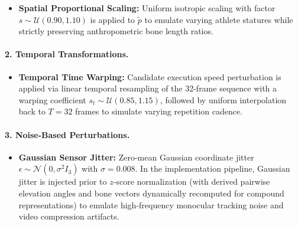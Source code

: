 \documentclass[runningheads]{llncs}
\begin{document}
\begin{itemize}
\begin{equation}
    \end{equation}
    Because $R_y(\alpha)$ acts strictly within the transverse plane, vertical displacement remains invariant ($\Delta y' = \Delta y$) and horizontal Euclidean radius is identically preserved:
    \begin{equation}
    \label{eq:yaw_invariance}
        \Delta x'^2 + \Delta z'^2 = (\Delta x \cos\alpha + \Delta z \sin\alpha)^2 + (-\Delta x \sin\alpha + \Delta z \cos\alpha)^2 = \Delta x^2 + \Delta z^2.
    \end{equation}
    Consequently, elevation angles satisfy $\theta' = \theta$, preserving biological limb inclination relative to gravity while teaching the network viewpoint invariance.
    \item \textbf{Spatial Proportional Scaling:} Uniform isotropic scaling with factor $s \sim \mathcal{U}(0.90, 1.10)$ is applied to $\tilde{p}$ to emulate varying athlete statures while strictly preserving anthropometric bone length ratios.
\end{itemize}

\paragraph{2. Temporal Transformations.}
\begin{itemize}
    \item \textbf{Temporal Time Warping:} Candidate execution speed perturbation is applied via linear temporal resampling of the 32-frame sequence with a warping coefficient $s_t \sim \mathcal{U}(0.85, 1.15)$, followed by uniform interpolation back to $T=32$ frames to simulate varying repetition cadence.
\end{itemize}

\paragraph{3. Noise-Based Perturbations.}
\begin{itemize}
    \item \textbf{Gaussian Sensor Jitter:} Zero-mean Gaussian coordinate jitter $\epsilon \sim \mathcal{N}(0, \sigma^2 I_3)$ with $\sigma = 0.008$. In the implementation pipeline, Gaussian jitter is injected prior to $z$-score normalization (with derived pairwise elevation angles and bone vectors dynamically recomputed for compound representations) to emulate high-frequency monocular tracking noise and video compression artifacts.
\end{itemize}
\end{document}
